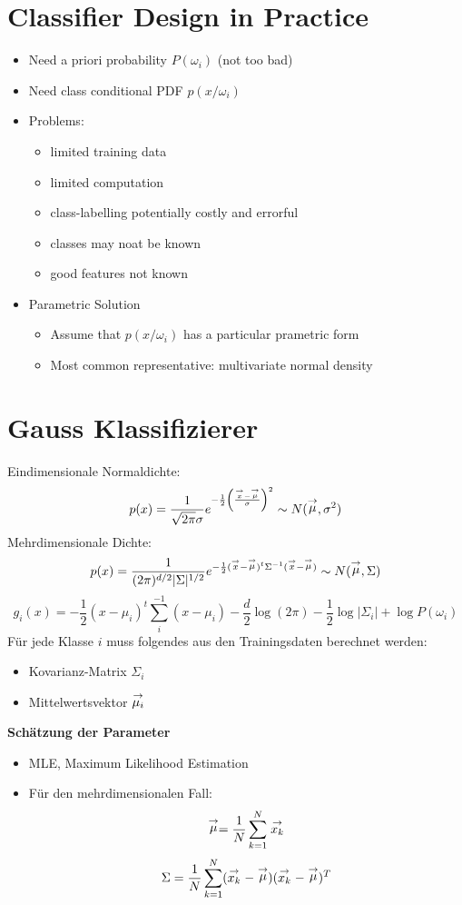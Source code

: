 \section{Classifier Design in Practice}
\begin{itemize}
	\item Need a priori probability $P(\omega_i)$ (not too bad)
	\item Need class conditional PDF $p(x/\omega_i)$
	\item Problems:
	\begin{itemize}
		\item limited training data
		\item limited computation
		\item class-labelling potentially costly and errorful
		\item classes may noat be known
		\item good features not known
	\end{itemize}
	\item Parametric Solution
	\begin{itemize}
		\item Assume that $p(x/\omega_i)$ has a particular prametric form
		\item Most common representative: multivariate normal density
	\end{itemize}
\end{itemize}

\section{Gauss Klassifizierer}

Eindimensionale Normaldichte: $$p(x) = \frac{1}{\sqrt{2\pi} \sigma} e^{- \frac{1}{2} \left( \frac{\stackrel{\to}{x} - \stackrel{\to}{\mu}}{\sigma} \right)^2} \sim N(\stackrel{\to}{\mu},\sigma^2)$$
Mehrdimensionale Dichte: $$p(x) = \frac{1}{(2\pi)^{d/2}|\Sigma|^{1/2}}e^{- \frac{1}{2} ( \stackrel{\to}{x} - \stackrel{\to}{\mu})^t \Sigma^{-1} (\stackrel{\to}{x} - \stackrel{\to}{\mu}) } \sim N(\stackrel{\to}{\mu},\Sigma)$$
$$g_i(x) = - \frac{1}{2} (x - \mu_i)^t \sum_i^{-1} (x - \mu_i) - \frac{d}{2} \log(2\pi) - \frac{1}{2} \log|\Sigma_i| + \log P(\omega_i)$$
Für jede Klasse $i$ muss folgendes aus den Trainingsdaten berechnet werden:
\begin{itemize}
\item Kovarianz-Matrix $\Sigma_i$ \item Mittelwertsvektor $\stackrel{\to}{\mu_i}$
\end{itemize}
\textbf{Schätzung der Parameter}
\begin{itemize}
\item MLE, Maximum Likelihood Estimation
\item Für den mehrdimensionalen Fall:
$$\stackrel{\to}{\mu} = \frac{1}{N} \sum\limits_{k=1}^N \stackrel{\to}{x_k}$$ $$\Sigma = \frac{1}{N} \sum\limits_{k=1}^N (\stackrel{\to}{x_k} - \stackrel{\to}{\mu})(\stackrel{\to}{x_k} - \stackrel{\to}{\mu})^T$$
\end{itemize}


